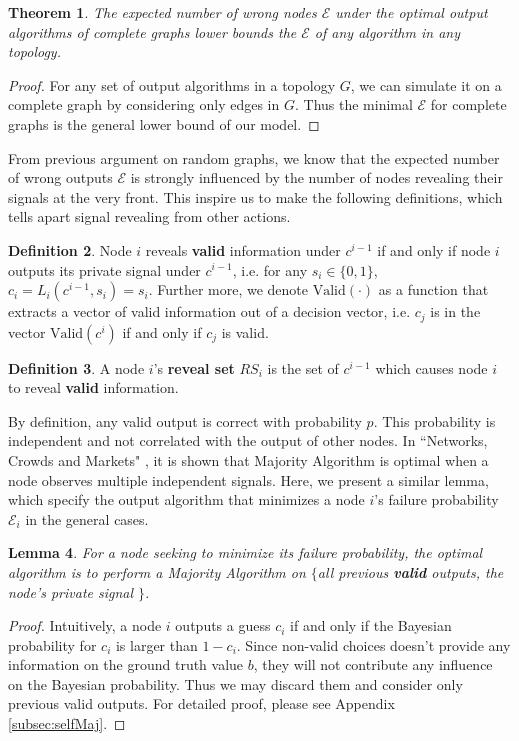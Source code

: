 \documentclass[a4paper,UKenglish]{lipics}
\newtheorem{thm}{Theorem}[section] %
\newtheorem{lem}[thm]{Lemma}
\theoremstyle{definition}
\newtheorem{defn}[thm]{Definition}
\begin{document}
\begin{thm}
\label{thm:complete graphs bound}
The expected number of wrong nodes $\mathcal{E}$ under the optimal output algorithms of complete graphs
	 lower bounds the $\mathcal{E}$ of any algorithm in any topology.
\end{thm}
\begin{proof}
For any set of output algorithms in a topology $G$, we can simulate it on a complete graph by considering only edges in $G$.
Thus the minimal $\mathcal{E}$ for complete graphs is the general lower bound of our model.
\end{proof}

From previous argument on random graphs,
	we know that the expected number of wrong outputs $\mathcal{E}$ is strongly influenced 
	by the number of nodes revealing their signals at the very front.
This inspire us to make the following definitions, which tells apart signal revealing from other actions.
\begin{defn}
Node $i$ reveals \textbf{valid} information under $c^{i-1}$ 
	if and only if node $i$ outputs its private signal under $c^{i-1}$, 
	i.e. for any $s_i\in \{0,1\}$, $c_i = L_i(c^{i-1}, s_i) = s_i$.
Further more, we denote $\text{Valid}(\cdot)$ as a function that extracts a vector of valid information out of a decision vector, i.e. 
	$c_j$ is in the vector $\text{Valid}(c^{i})$ if and only if $c_j$ is valid.
\end{defn}

\begin{defn}
A node $i$'s \textbf{reveal set} $RS_i$ is the set of $c^{i-1}$ which causes node $i$ to reveal \textbf{valid} information.
\end{defn}

By definition, any valid output is correct with probability $p$.
This probability is independent and not correlated with the output of other nodes.
In ``Networks, Crowds and Markets" \cite{easley2010networks},
	it is shown that Majority Algorithm is optimal when a node observes multiple independent signals.
Here, we present a similar lemma, which specify the output algorithm that minimizes a node $i$'s failure probability $\mathcal{E}_i$ in the general cases.

\begin{lem}
\label{lem:selfMaj}
For a node seeking to minimize its failure probability, 
	the optimal algorithm is to perform a Majority Algorithm on 
	$\{$all previous \textbf{valid} outputs, the node's private signal $\}$.
\end{lem}
\begin{proof}
Intuitively, a node $i$ outputs a guess $c_i$ if and only if the Bayesian probability for $c_i$ is larger than $1 - c_i$.
Since non-valid choices doesn't provide any information on the ground truth value $b$,
	they will not contribute any influence on the Bayesian probability.
Thus we may discard them and consider only previous valid outputs.
For detailed proof, please see Appendix \ref{subsec:selfMaj}.
\end{proof}
\end{document}
